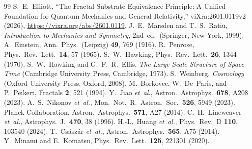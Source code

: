 \documentclass[11pt,letterpaper]{article}
\begin{document}
\begin{thebibliography}{99}
S.~E.~Elliott,
``The Fractal Substrate Equivalence Principle: A Unified Foundation
for Quantum Mechanics and General Relativity,''
viXra:2601.0119v2 (2026),
\url{https://vixra.org/abs/2601.0119}.
J.~E.~Marsden and T.~S.~Ratiu,
\emph{Introduction to Mechanics and Symmetry},
2nd~ed.\ (Springer, New York, 1999).
A.~Einstein,
Ann.\ Phys.\ (Leipzig) \textbf{49}, 769 (1916).
R.~Penrose,
Phys.\ Rev.\ Lett.\ \textbf{14}, 57 (1965).
S.~W.~Hawking,
Phys.\ Rev.\ Lett.\ \textbf{26}, 1344 (1970).
S.~W.~Hawking and G.~F.~R.~Ellis,
\emph{The Large Scale Structure of Space-Time}
(Cambridge University Press, Cambridge, 1973).
S.~Weinberg,
\emph{Cosmology} (Oxford University Press, Oxford, 2008).
M.~Borkovec, W.~De~Paris, and P.~Peikert,
Fractals \textbf{2}, 521 (1994).
Y.~Jiao \textit{et~al.},
Astron.\ Astrophys.\ \textbf{678}, A208 (2023).
A.~S.~Nikonov \textit{et~al.},
Mon.\ Not.\ R.\ Astron.\ Soc.\ \textbf{526}, 5949 (2023).
Planck Collaboration,
Astron.\ Astrophys.\ \textbf{571}, A27 (2014).
C.~H.~Lineweaver \textit{et~al.},
Astrophys.\ J.\ \textbf{470}, 38 (1996).
H.-L.~Huang \textit{et~al.},
Phys.\ Rev.\ D \textbf{110}, 103540 (2024).
T.~Cs\'asz\'ar \textit{et~al.},
Astron.\ Astrophys.\ \textbf{565}, A75 (2014).
Y.~Minami and E.~Komatsu,
Phys.\ Rev.\ Lett.\ \textbf{125}, 221301 (2020).
\end{thebibliography}
\end{document}
